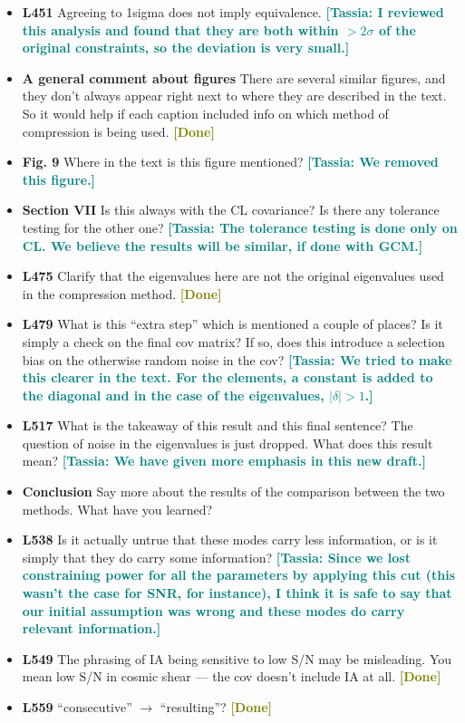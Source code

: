 \documentclass{article}
\newcommand\tassia[1]{{\bf {\textcolor{teal}{[Tassia: #1]}}}}
\newcommand\done{{\bf {\textcolor{olive}{[Done]}}}}
\begin{document}
\begin{itemize}
	\item \textbf{L451} Agreeing to 1sigma does not imply equivalence. \tassia{I reviewed this analysis and found that they are both within $> 2\sigma$ of the original constraints, so the deviation is very small.}
	\item \textbf{A general comment about figures} There are several similar figures, and they don’t always appear right next to where they are described in the text. So it would help if each caption included info on which method of compression is being used. \done
	\item \textbf{Fig. 9} Where in the text is this figure mentioned? \tassia{We removed this figure.}
	\item \textbf{Section VII} Is this always with the CL covariance? Is there any tolerance testing for the other one? \tassia{The tolerance testing is done only on CL. We believe the results will be similar, if done with GCM.}
	\item \textbf{L475} Clarify that the eigenvalues here are not the original eigenvalues used in the compression method. \done
	\item \textbf{L479} What is this “extra step” which is mentioned a couple of places? Is it simply a check on the final cov matrix? If so, does this introduce a selection bias on the otherwise random noise in the cov? \tassia{We tried to make this clearer in the text. For the elements, a constant is added to the diagonal and in the case of the eigenvalues, $|\delta| > 1$.}
	\item \textbf{L517} What is the takeaway of this result and this final sentence? The question of noise in the eigenvalues is just dropped. What does this result mean? \tassia{We have given more emphasis in this new draft.}
	\item \textbf{Conclusion} Say more about the results of the comparison between the two methods. What have you learned?
	\item \textbf{L538} Is it actually untrue that these modes carry less information, or is it simply that they do carry some information? \tassia{Since we lost constraining power for all the parameters by applying this cut (this wasn't the case for SNR, for instance), I think it is safe to say that our initial assumption was wrong and these modes do carry relevant information.}
	\item \textbf{L549} The phrasing of IA being sensitive to low S/N may be misleading. You mean low S/N in cosmic shear — the cov doesn’t include IA at all. \done
	\item \textbf{L559} “consecutive” $\rightarrow$ “resulting”? \done

\end{itemize}
\end{document}
